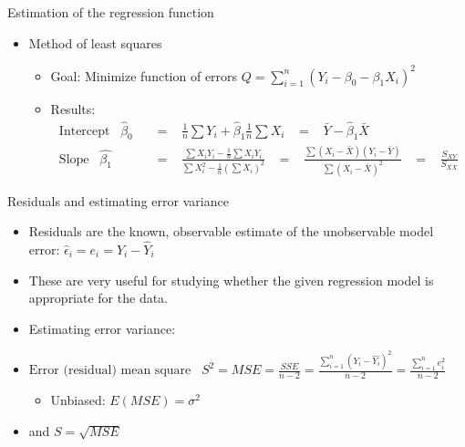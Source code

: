 \documentclass{article}
\begin{document}
Estimation of the regression function
\begin{itemize}
    \item Method of least squares
    \begin{itemize}
        \item Goal: Minimize function of errors $\displaystyle Q = \sum_{i = 1}^n (Y_i - \beta_0 - \beta_1 X_i)^2$
        \item Results:
        \begin{align*}
            \text{Intercept} \hspace{10pt} \hat{\beta}_0 \hspace{10pt} &= \hspace{10pt} \frac{1}{n}\sum Y_i + \hat{\beta}_1 \frac{1}{n} \sum X_i \hspace{10pt} = \hspace{10pt} \bar{Y}- \hat{\beta}_1 \bar{X} \\
            \text{Slope} \hspace{10pt} \hat{\beta_1} \hspace{10pt} &= \hspace{10pt} \frac{\sum X_i Y_i -\frac{1}{n} \sum X_i Y_i}{\sum X_i^2 - \frac{1}{n}(\sum X_i)^2} \hspace{10pt} = \hspace{10pt} \frac{\sum(X_i - \bar{X})(Y_i - \bar{Y})}{\sum(X_i - \bar{X})^2} \hspace{10pt} = \hspace{10pt} \frac{S_{XY}}{S_{XX}}
        \end{align*}
   \end{itemize}
\end{itemize}\bigskip

Residuals and estimating error variance
\begin{itemize}
    \item Residuals are the known, observable estimate of the unobservable model error: $\hat{\epsilon}_i = e_i = Y_i - \hat{Y}_i$
    \item[] These are very useful for studying whether the given regression model is appropriate for the data.
    \item Estimating error variance:
    \item[] $\displaystyle \text{Error (residual) mean square} \hspace{10pt} S^2 = MSE = \frac{SSE}{n - 2} = \frac{\sum_{i = 1}^n (Y_i - \hat{Y_i})^2}{n - 2} = \frac{\sum_{i = 1}^n e_i^2}{n - 2}$
    \begin{itemize}
        \item Unbiased: $E(MSE) = \sigma^2$
    \end{itemize} 
    \item[] and $S = \sqrt{MSE}$
\end{itemize}\newpage
\end{document}
